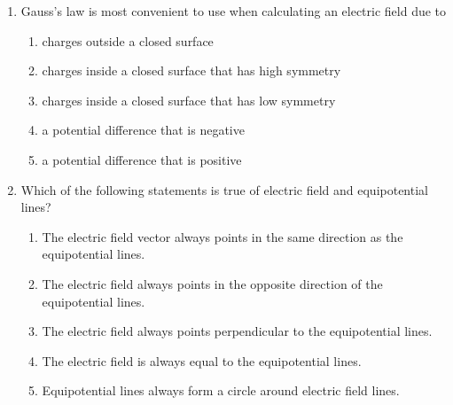 \documentclass{../../oss-apphys}
\begin{document}
\begin{multicols}{2}
\begin{enumerate}[leftmargin=18pt]
  \item Gauss's law is most convenient to use when calculating an electric field
    due to
    \begin{enumerate}[noitemsep,topsep=0pt,leftmargin=18pt,label=(\Alph*)]
    \item charges outside a closed surface
    \item charges inside a closed surface that has high symmetry
    \item charges inside a closed surface that has low symmetry
    \item a potential difference that is negative
    \item a potential difference that is positive
    \end{enumerate}

  \item Which of the following statements is true of electric field and
    equipotential lines?
    \begin{enumerate}[noitemsep,topsep=0pt,leftmargin=18pt,label=(\Alph*)]
    \item The electric field vector always points in the same direction as the
      equipotential lines.
    \item The electric field always points in the opposite direction of the
      equipotential lines.
    \item The electric field always points perpendicular to the equipotential
      lines.
    \item The electric field is always equal to the equipotential lines.
    \item Equipotential lines always form a circle around electric field lines.
    \end{enumerate}


\end{enumerate}
\end{multicols}
\end{document}
